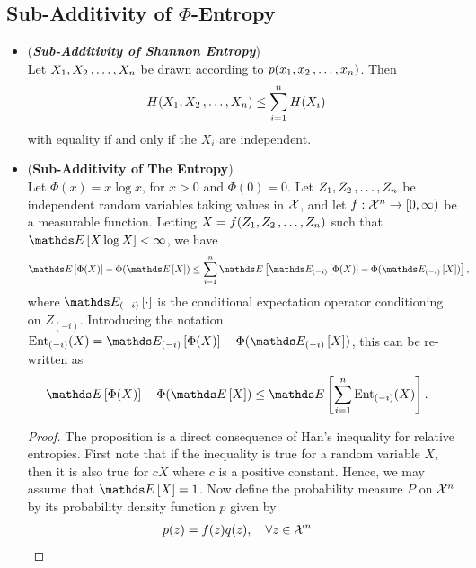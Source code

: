 \documentclass[11pt]{article}
\begin{document}
\subsection{Sub-Additivity of $\Phi$-Entropy}
\begin{itemize}
\item \begin{remark}(\emph{\textbf{Sub-Additivity of Shannon Entropy}})\\
Let $X_1, X_2 \,{,}\ldots{,}\, X_n$ be drawn according to $p(x_1, x_2 \,{,}\ldots{,}\, x_n)$. Then
\begin{align*}
H(X_1, X_2 \,{,}\ldots{,}\, X_n) &\le \sum_{i=1}^{n}H(X_i)  
\end{align*} with equality if and only if the $X_i$ are independent.
\end{remark}

\item \begin{proposition} (\textbf{Sub-Additivity of The Entropy}) \citep{boucheron2013concentration}\\
Let $\Phi(x) = x\log x$,  for $x >0$ and $\Phi(0) = 0$. Let $Z_1, Z_2 \,{,}\ldots{,}\, Z_n$ be independent random variables taking values in ${\mathcal X}$, and let $f: {\mathcal X}^n \to [0, \infty)$ be a measurable function. Letting $X = f(Z_1, Z_2 \,{,}\ldots{,}\, Z_n)$ such that $\E{}{X\log X} < \infty$, we have 
\begin{align}
\E{}{\Phi(X)} - \Phi(\E{}{X}) &\le \sum_{i=1}^{n}\E{}{\E{(-i)}{\Phi(X)} - \Phi(\E{(-i)}{X})}, \label{ineqn: sub_additivity_phi_entropy}
\end{align} where $\E{(-i)}{\cdot}$ is the conditional expectation operator conditioning on $Z_{(-i)}$. Introducing the notation $\text{Ent}_{(-i)}(X) = \E{(-i)}{\Phi(X)} - \Phi(\E{(-i)}{X})$, this can be re-written as
\begin{align}
\E{}{\Phi(X)} - \Phi(\E{}{X}) &\le \E{}{\sum_{i=1}^{n} \text{Ent}_{(-i)}(X)}. \label{ineqn: sub_additivity_phi_entropy_2}
\end{align}
\end{proposition}
\begin{proof}
The proposition is a direct consequence of Han's inequality for relative entropies. First note that if the inequality is true for a random variable $X$, then it is also true for $cX$ where $c$ is a positive constant. Hence, we may assume that $\E{}{X} = 1$. Now define the probability measure $P$ on ${\mathcal X}^n$ by its probability density function $p$ given by
\begin{align*}
p(z) &= f(z) q(z), \quad \forall z \in \cX^n

\end{align*}
\end{proof}
\end{itemize}
\end{document}

